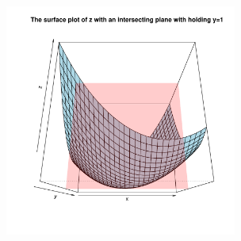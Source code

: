 \documentclass[conference,final,11pt,technote,onecolumn]{IEEEtran}\usepackage[]{graphicx}\usepackage[]{color}
\newenvironment{knitrout}{}{} %
\begin{document}
\begin{knitrout}
{\centering \includegraphics[width=3in]{figure/minimal-Plot-surface-2-1} 

}



\end{knitrout}
\end{document}
